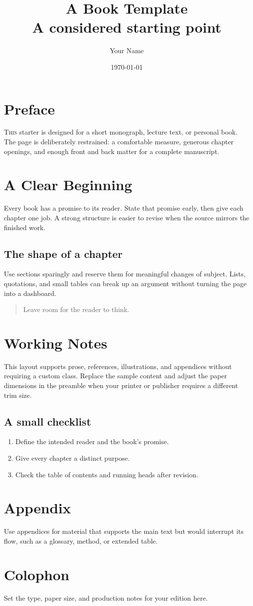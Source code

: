 \documentclass[11pt,oneside]{book}
\title{A Book Template\\[0.4em]\large A considered starting point}
\author{Your Name}
\date{\today}
\begin{document}
\frontmatter
\maketitle
\chapter*{Preface}
\lettrine[lines=3,loversize=0.15]{T}{his} starter is designed for a short monograph, lecture text, or personal book. The page is deliberately restrained: a comfortable measure, generous chapter openings, and enough front and back matter for a complete manuscript.
\tableofcontents
\mainmatter
\chapter{A Clear Beginning}
Every book has a promise to its reader. State that promise early, then give each chapter one job. A strong structure is easier to revise when the source mirrors the finished work.
\section{The shape of a chapter}
Use sections sparingly and reserve them for meaningful changes of subject. Lists, quotations, and small tables can break up an argument without turning the page into a dashboard.
\begin{quote}
  Leave room for the reader to think.
\end{quote}
\chapter{Working Notes}
This layout supports prose, references, illustrations, and appendices without requiring a custom class. Replace the sample content and adjust the paper dimensions in the preamble when your printer or publisher requires a different trim size.
\section{A small checklist}
\begin{enumerate}
\item Define the intended reader and the book's promise.
\item Give every chapter a distinct purpose.
\item Check the table of contents and running heads after revision.
\end{enumerate}
\appendix
\chapter{Appendix}
Use appendices for material that supports the main text but would interrupt its flow, such as a glossary, method, or extended table.
\backmatter
\chapter*{Colophon}
Set the type, paper size, and production notes for your edition here.
\end{document}
